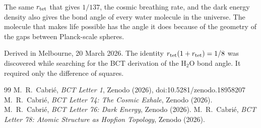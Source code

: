 \documentclass[aps,prl,twocolumn,showpacs,superscriptaddress]{revtex4-2}
\begin{document}
The same $r_{\rm tet}$ that gives $1/137$, the cosmic breathing rate, and 
the dark energy density also gives the bond angle of every water molecule 
in the universe. The molecule that makes life possible has the angle it does 
because of the geometry of the gaps between Planck-scale spheres.

\begin{acknowledgments}
Derived in Melbourne, 20 March 2026. The identity $r_{\rm tet}(1+r_{\rm tet}) 
= 1/8$ was discovered while searching for the BCT derivation of the H$_2$O 
bond angle. It required only the difference of squares.
\end{acknowledgments}

\begin{thebibliography}{99}
 M.~R.~Cabri\'e, \textit{BCT Letter 1}, Zenodo (2026),
doi:10.5281/zenodo.18958207
 M.~R.~Cabri\'e, \textit{BCT Letter 74: The Cosmic Exhale},
Zenodo (2026).
 M.~R.~Cabri\'e, \textit{BCT Letter 76: Dark Energy},
Zenodo (2026).
 M.~R.~Cabri\'e, \textit{BCT Letter 78: Atomic Structure
as Hopfion Topology}, Zenodo (2026).
\end{thebibliography}
\end{document}
